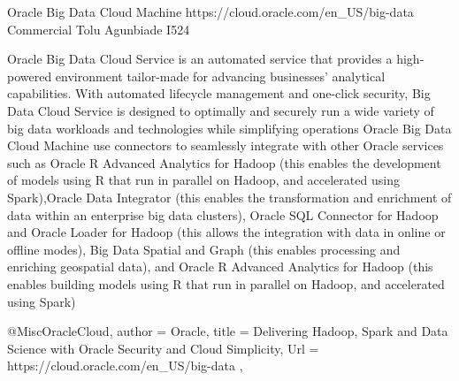 Oracle Big Data Cloud Machine 
https://cloud.oracle.com/en_US/big-data 
Commercial
Tolu Agunbiade 
I524


Oracle Big Data Cloud Service is an automated service that provides a
high-powered environment tailor-made for advancing businesses’ analytical
capabilities. With automated lifecycle management and one-click security, Big
Data Cloud Service is designed to optimally and securely run a wide variety of
big data workloads and technologies while simplifying
operations\cite{OracleCloud} Oracle Big Data Cloud Machine use connectors to
seamlessly integrate with other Oracle services such as Oracle R Advanced
Analytics for Hadoop (this enables the development of models using R that run in
parallel on Hadoop, and accelerated using Spark),Oracle Data Integrator (this
enables the transformation and enrichment of data within an enterprise big data
clusters), Oracle SQL Connector for Hadoop and Oracle Loader for Hadoop (this
allows the integration with data in online or offline modes), Big Data Spatial
and Graph (this enables processing and enriching geospatial data), and Oracle R
Advanced Analytics for Hadoop (this enables building models using R that run in
parallel on Hadoop, and accelerated using Spark)\cite{OracleCloud}


@Misc{OracleCloud, 
author = {Oracle}, 
title = {Delivering Hadoop, Spark and Data Science with Oracle Security and Cloud Simplicity}, 
Url = {https://cloud.oracle.com/en_US/big-data },
}
